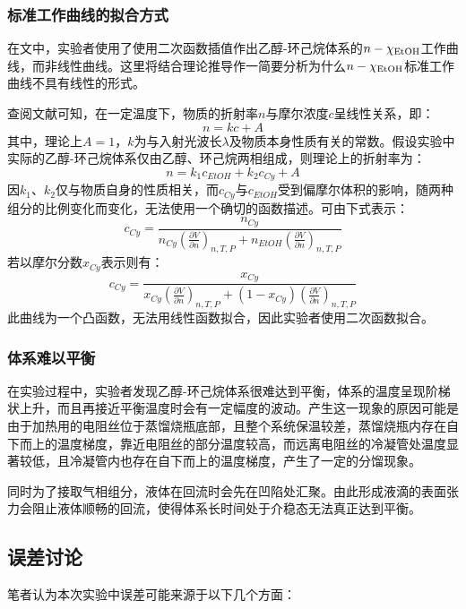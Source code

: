 \documentclass[12pt]{article}
\begin{document}
					\subsubsection{标准工作曲线的拟合方式}
					在文中，实验者使用了使用二次函数插值作出乙醇-环己烷体系的$n-\chi_{\ce{EtOH}}$工作曲线，而非线性曲线。这里将结合理论推导作一简要分析为什么$n-\chi_{\ce{EtOH}}$标准工作曲线不具有线性的形式。\par 
					查阅文献可知\citealp{wenxian2}，在一定温度下，物质的折射率$n$与摩尔浓度$c$呈线性关系，即：
					$$
					n=kc+A
					$$
					其中，理论上$A=1$，$k$为与入射光波长$\lambda$及物质本身性质有关的常数。假设实验中实际的乙醇-环己烷体系仅由乙醇、环己烷两相组成，则理论上的折射率为：
					$$
					n=k_{1}c_{EtOH}+k_{2}c_{Cy}+A
					$$ 		
					因$k_{1}$、$k_{2}$仅与物质自身的性质相关，而$c_{Cy}$与$c_{EtOH}$受到偏摩尔体积的影响，随两种组分的比例变化而变化，无法使用一个确切的函数描述。可由下式表示：
					$$
					c_{Cy}=\frac{n_{Cy}}{n_{Cy}(\frac{\partial V}{\partial n})_{n,T,P}+n_{EtOH}(\frac{\partial V}{\partial n})_{n,T,P}}
					$$
					若以摩尔分数$x_{Cy}$表示则有：
					$$
					c_{Cy}=\frac{x_{Cy}}{x_{Cy}(\frac{\partial V}{\partial n})_{n,T,P}+(1-x_{Cy})(\frac{\partial V}{\partial n})_{n,T,P}}
					$$
					此曲线为一个凸函数，无法用线性函数拟合，因此实验者使用二次函数拟合。\par
					\subsubsection{体系难以平衡}
					在实验过程中，实验者发现乙醇-环己烷体系很难达到平衡，体系的温度呈现阶梯状上升，而且再接近平衡温度时会有一定幅度的波动。产生这一现象的原因可能是由于加热用的电阻丝位于蒸馏烧瓶底部，且整个系统保温较差，蒸馏烧瓶内存在自下而上的温度梯度，靠近电阻丝的部分温度较高，而远离电阻丝的冷凝管处温度显著较低，且冷凝管内也存在自下而上的温度梯度，产生了一定的分馏现象。\par 
					同时为了接取气相组分，液体在回流时会先在凹陷处汇聚。由此形成液滴的表面张力会阻止液体顺畅的回流，使得体系长时间处于介稳态无法真正达到平衡。\par
					\subsection{误差讨论}
					笔者认为本次实验中误差可能来源于以下几个方面：
\end{document}
